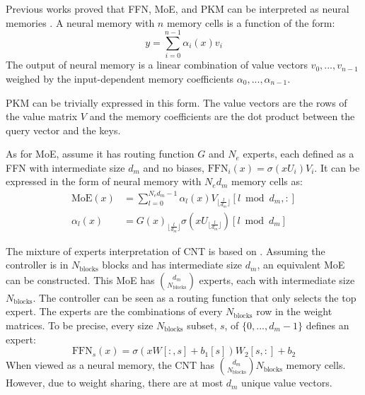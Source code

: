 Previous works proved that FFN, MoE, and PKM can be interpreted as neural memories \cite{liu_towards_2023}. A neural memory with $n$ memory cells is a function of the form: \begin{equation}
    y = \sum_{i=0}^{n-1} \alpha_i(x)v_i
\end{equation}
The output of neural memory is a linear combination of value vectors $v_0,...,v_{n-1}$ weighed by the input-dependent memory coefficients $\alpha_0,...,\alpha_{n-1}$.

PKM can be trivially expressed in this form. The value vectors are the rows of the value matrix $V$ and the memory coefficients are the dot product between the query vector and the keys.

As for MoE, assume it has routing function $G$ and $N_e$ experts, each defined as a FFN with intermediate size $d_m$ and no biases, $\text{FFN}_i(x) = \sigma (xU_i)V_i$. It can be expressed in the form of neural memory with $N_ed_m$ memory cells as: 
\begin{equation}
    \begin{split}
        \text{MoE}(x) &= \sum_{l=0}^{N_ed_m-1} \alpha_l(x) V_{\lfloor \frac l {d_m} \rfloor}[l \bmod d_m, :] \\
        \alpha_l(x) &= G(x)_{\lfloor \frac l {d_m} \rfloor} \sigma(xU_{\lfloor \frac l {d_m} \rfloor})[l \bmod d_m]
    \end{split}
\end{equation}

The mixture of experts interpretation of CNT is based on . Assuming the controller is in $N_\text{blocks}$ blocks and has intermediate size $d_m$, an equivalent MoE can be constructed. This MoE has $d_m \choose N_\text{blocks}$ experts, each with intermediate size $N_\text{blocks}$. The controller can be seen as a routing function that only selects the top expert. The experts are the combinations of every $N_\text{blocks}$ row in the weight matrices. To be precise, every size $N_\text{blocks}$ subset, $s$, of $\{0,...,d_m-1\}$ defines an expert:
\begin{equation}
    \text{FFN}_s(x) = \sigma(xW[:,s]+b_1[s])W_2[s,:]+b_2
\end{equation}
When viewed as a neural memory, the CNT has ${d_m \choose N_\text{blocks}} N_\text{blocks}$ memory cells. However, due to weight sharing, there are at most $d_m$ unique value vectors.
